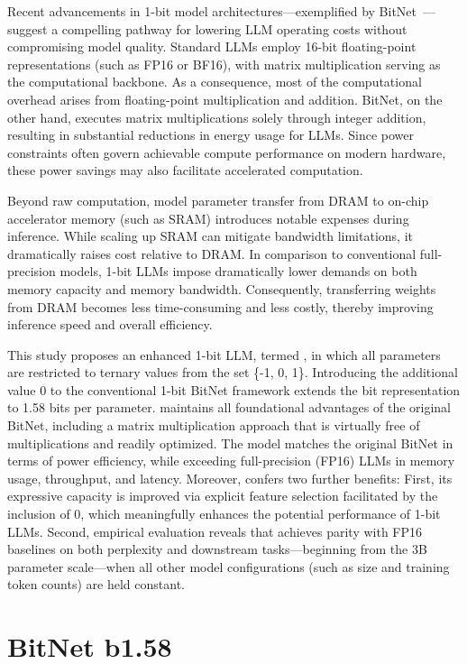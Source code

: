 Recent advancements in 1-bit model architectures—exemplified by BitNet~\cite{bitnet}—suggest a compelling pathway for lowering LLM operating costs without compromising model quality. Standard LLMs employ 16-bit floating-point representations (such as FP16 or BF16), with matrix multiplication serving as the computational backbone. As a consequence, most of the computational overhead arises from floating-point multiplication and addition. BitNet, on the other hand, executes matrix multiplications solely through integer addition, resulting in substantial reductions in energy usage for LLMs. Since power constraints often govern achievable compute performance on modern hardware, these power savings may also facilitate accelerated computation.

Beyond raw computation, model parameter transfer from DRAM to on-chip accelerator memory (such as SRAM) introduces notable expenses during inference. While scaling up SRAM can mitigate bandwidth limitations, it dramatically raises cost relative to DRAM. In comparison to conventional full-precision models, 1-bit LLMs impose dramatically lower demands on both memory capacity and memory bandwidth. Consequently, transferring weights from DRAM becomes less time-consuming and less costly, thereby improving inference speed and overall efficiency.

This study proposes an enhanced 1-bit LLM, termed \textbf{}, in which all parameters are restricted to ternary values from the set \{-1, 0, 1\}. Introducing the additional value 0 to the conventional 1-bit BitNet framework extends the bit representation to 1.58 bits per parameter.  maintains all foundational advantages of the original BitNet, including a matrix multiplication approach that is virtually free of multiplications and readily optimized. The model matches the original BitNet in terms of power efficiency, while exceeding full-precision (FP16) LLMs in memory usage, throughput, and latency. Moreover,  confers two further benefits: First, its expressive capacity is improved via explicit feature selection facilitated by the inclusion of 0, which meaningfully enhances the potential performance of 1-bit LLMs. Second, empirical evaluation reveals that  achieves parity with FP16 baselines on both perplexity and downstream tasks—beginning from the 3B parameter scale—when all other model configurations (such as size and training token counts) are held constant.

\section{BitNet b1.58}

